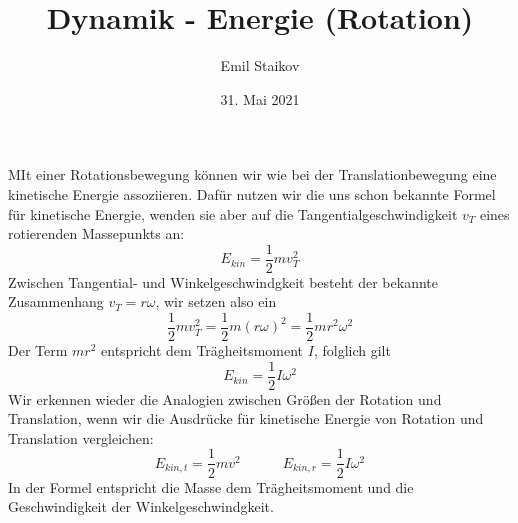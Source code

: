 \documentclass[11pt]{article}
\title{Dynamik - Energie (Rotation)}
\author{Emil Staikov}
\date{31. Mai 2021}
\begin{document}
\maketitle
MIt einer Rotationsbewegung können wir wie bei der Translationbewegung eine kinetische Energie assoziieren. Dafür nutzen wir die uns schon bekannte Formel für kinetische Energie, wenden sie aber auf die Tangentialgeschwindigkeit $v_T$ eines rotierenden Massepunkts an: 
\begin{equation*}
        E_{kin} = \frac{1}{2} m v_T^2
\end{equation*}
Zwischen Tangential- und Winkelgeschwindgkeit besteht der bekannte Zusammenhang $v_T = r\omega$, wir setzen also ein 
\begin{equation*}
        \frac{1}{2} m v_T^2 = \frac{1}{2}m (r\omega)^2 = \frac{1}{2}mr^2 \omega^2
\end{equation*}
Der Term $mr^2$ entspricht dem Trägheitsmoment $I$, folglich gilt 
\begin{equation*}
        E_{kin} = \frac{1}{2} I \omega^2
\end{equation*} 
Wir erkennen wieder die Analogien zwischen Größen der Rotation und Translation, wenn wir die Ausdrücke für kinetische Energie von Rotation und Translation vergleichen: 
\begin{equation*}
        E_{kin, t} = \frac{1}{2} m v^2 \quad \quad \quad E_{kin, r} = \frac{1}{2} I \omega^2
\end{equation*}
In der Formel entspricht die Masse dem Trägheitsmoment und die Geschwindigkeit der Winkelgeschwindgkeit. 
\end{document}
